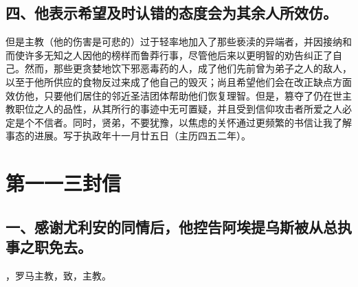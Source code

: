 
\subsection{四、他表示希望及时认错的态度会为其余人所效仿。}

但是主教（他的伤害是可悲的）过于轻率地加入了那些亵渎的异端者，并因接纳和而使许多无知之人因他的榜样而鲁莽行事，尽管他后来以更明智的劝告纠正了自己。然而，那些更贪婪地饮下邪恶毒药的人，成了他们先前曾为弟子之人的敌人，以至于他所供应的食物反过来成了他自己的毁灭；尚且希望他们会在改正缺点方面效仿他，只要他们居住的邻近圣洁团体帮助他们恢复理智。但是，篡夺了仍在世主教职位之人的品性，从其所行的事迹中无可置疑，并且受到信仰攻击者所爱之人必定是个不信者。同时，贤弟，不要犹豫，以焦虑的关怀通过更频繁的书信让我了解事态的进展。写于执政年十一月廿五日（主历四五二年）。\par



\section{第一一三封信}

\par


\subsection{一、感谢尤利安的同情后，他控告阿埃提乌斯被从总执事之职免去。}

，罗马主教，致，主教。\par

